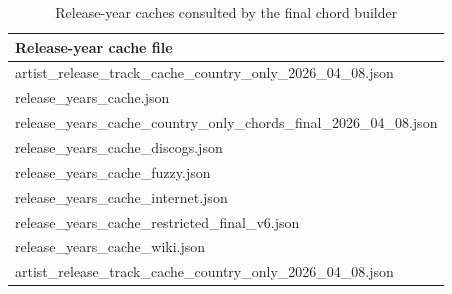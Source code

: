 \begin{table}[H]
\centering
\caption{Release-year caches consulted by the final chord builder}
\label{tab:release_caches}
\begin{tabular}{l}
\toprule
Release-year cache file \\
\midrule
artist\_release\_track\_cache\_country\_only\_2026\_04\_08.json \\
release\_years\_cache.json \\
release\_years\_cache\_country\_only\_chords\_final\_2026\_04\_08.json \\
release\_years\_cache\_discogs.json \\
release\_years\_cache\_fuzzy.json \\
release\_years\_cache\_internet.json \\
release\_years\_cache\_restricted\_final\_v6.json \\
release\_years\_cache\_wiki.json \\
artist\_release\_track\_cache\_country\_only\_2026\_04\_08.json \\
\bottomrule
\end{tabular}
\end{table}
